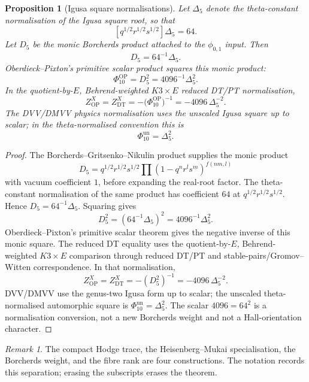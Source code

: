 \documentclass[11pt]{amsart}
\newtheorem{proposition}[theorem]{Proposition}
\theoremstyle{definition}
\theoremstyle{remark}
\newtheorem{remark}[theorem]{Remark}
\begin{document}
\begin{proposition}[Igusa square normalisations]
Let \(\Delta_5\) denote the theta-constant normalisation of the Igusa
square root, so that
\[
        [q^{1/2}r^{1/2}s^{1/2}]\Delta_5=64 .
\]
Let \(D_5\) be the monic Borcherds product attached to the
\(\phi_{0,1}\) input. Then
\[
        D_5=64^{-1}\Delta_5 .
\]
Oberdieck--Pixton's primitive scalar product squares this monic product:
\[
        \Phi_{10}^{\mathrm{OP}}
        =D_5^2
        =4096^{-1}\Delta_5^2.
\]
In the quotient-by-\(E\), Behrend-weighted \(K3\times E\) reduced
DT/PT normalisation,
\[
        Z^X_{\mathrm{OP}}
        =Z^X_{\mathrm{DT}}
        =-\bigl(\Phi_{10}^{\mathrm{OP}}\bigr)^{-1}
        =-4096\,\Delta_5^{-2}.
\]
The DVV/DMVV physics normalisation uses the unscaled Igusa square up to
scalar; in the theta-normalised convention this is
\[
        \Phi_{10}^{\mathrm{un}}=\Delta_5^2 .
\]
\end{proposition}

\begin{proof}
The Borcherds--Gritsenko--Nikulin product supplies the monic product
\[
        D_5
        =
        q^{1/2}r^{1/2}s^{1/2}
        \prod(1-q^nr^ls^m)^{f(nm,l)}
\]
with vacuum coefficient \(1\), before expanding the real-root factor. The
theta-constant normalisation of the same product has coefficient \(64\) at
\(q^{1/2}r^{1/2}s^{1/2}\). Hence \(D_5=64^{-1}\Delta_5\). Squaring gives
\[
        D_5^2=(64^{-1}\Delta_5)^2=4096^{-1}\Delta_5^2 .
\]
Oberdieck--Pixton's primitive scalar theorem gives the negative inverse of
this monic square. The reduced DT equality uses the quotient-by-\(E\),
Behrend-weighted \(K3\times E\) comparison through reduced DT/PT and
stable-pairs/Gromov--Witten correspondence. In that normalisation,
\[
        Z^X_{\mathrm{OP}}=Z^X_{\mathrm{DT}}
        =-(D_5^2)^{-1}=-4096\,\Delta_5^{-2}.
\]
DVV/DMVV use the genus-two Igusa form up to scalar; the unscaled
theta-normalised automorphic square is
\(\Phi_{10}^{\mathrm{un}}=\Delta_5^2\).
The scalar \(4096=64^2\) is a normalisation conversion, not a new
Borcherds weight and not a Hall-orientation character.
\end{proof}

\begin{remark}
The compact Hodge trace, the Heisenberg--Mukai specialisation, the
Borcherds weight, and the fibre rank are four constructions. The notation
records this separation; erasing the subscripts erases the theorem.
\end{remark}
\end{document}
